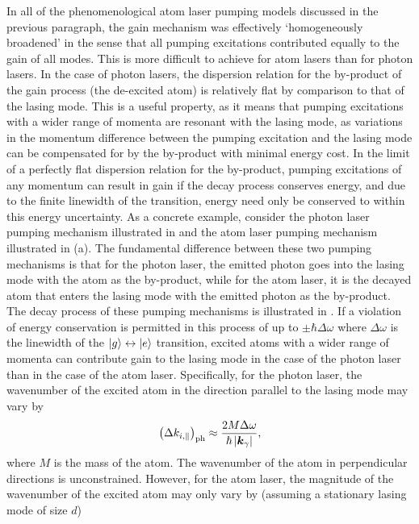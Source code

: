 In all of the phenomenological atom laser pumping models discussed in the previous paragraph, the gain mechanism was effectively `homogeneously broadened' in the sense that all pumping excitations contributed equally to the gain of all modes.  This is more difficult to achieve for atom lasers than for photon lasers.  In the case of photon lasers, the dispersion relation for the by-product of the gain process (the de-excited atom) is relatively flat by comparison to that of the lasing mode.  This is a useful property, as it means that pumping excitations with a wider range of momenta are resonant with the lasing mode, as variations in the momentum difference between the pumping excitation and the lasing mode can be compensated for by the by-product with minimal energy cost.  In the limit of a perfectly flat dispersion relation for the by-product, pumping excitations of any momentum can result in gain if the decay process conserves energy, and due to the finite linewidth of the transition, energy need only be conserved to within this energy uncertainty.  As a concrete example, consider the photon laser pumping mechanism illustrated in  and the atom laser pumping mechanism illustrated in (a).  The fundamental difference between these two pumping mechanisms is that for the photon laser, the emitted photon goes into the lasing mode with the atom as the by-product, while for the atom laser, it is the decayed atom that enters the lasing mode with the emitted photon as the by-product.  The decay process of these pumping mechanisms is illustrated in .  If a violation of energy conservation is permitted in this process of up to $\pm \hbar\Delta\omega$ where $\Delta\omega$ is the linewidth of the ${\left|g\right>} \leftrightarrow {\ensuremath{\left|e\right>}}$ transition, excited atoms with a wider range of momenta can contribute gain to the lasing mode in the case of the photon laser than in the case of the atom laser.  Specifically, for the photon laser, the wavenumber of the excited atom in the direction parallel to the lasing mode may vary by
\begin{align*}
    \left(\Delta k_{i,\parallel}\right)_\text{ph} \approx \frac{2 M \Delta\omega}{\hbar \left|\bm{k}_\gamma\right|},
\end{align*}
where $M$ is the mass of the atom.  The wavenumber of the atom in perpendicular directions is unconstrained.  However, for the atom laser, the magnitude of the wavenumber of the excited atom may only vary by (assuming a stationary lasing mode of size $d$)
